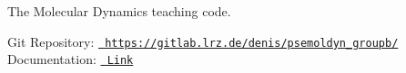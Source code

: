 The Molecular Dynamics teaching code.

Git Repository\+: \href{https://gitlab.lrz.de/denis/psemoldyn_groupb/}{\texttt{ https\+://gitlab.\+lrz.\+de/denis/psemoldyn\+\_\+groupb/}} ~\newline
 Documentation\+: \href{doxys_documentation/html/index.html}{\texttt{ Link}} 